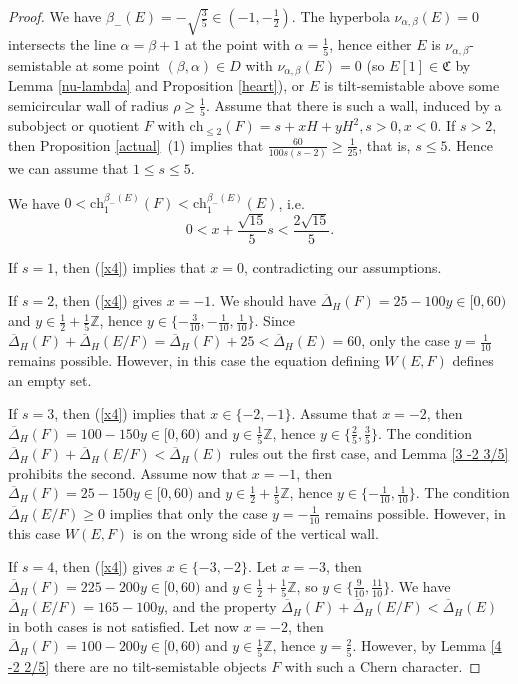 \documentclass[10pt,a4paper]{amsart}
\begin{document}
	\begin{proof} We have $\beta_-(E)=-\sqrt{\frac 35}\in(-1,-\frac 12)$. The hyperbola $\nu_{\alpha,\beta}(E)=0$ intersects the line $\alpha=\beta+1$ at the point with $\alpha=\frac 15$, hence either $E$ is $\nu_{\alpha,\beta}$-semistable at some point $(\beta,\alpha)\in D$ with $\nu_{\alpha,\beta}(E)=0$ (so $E[1]\in\mathfrak C$ by Lemma \ref{nu-lambda} and Proposition \ref{heart}), or $E$ is tilt-semistable above some semicircular wall of radius $\rho\ge\frac 15$. Assume that there is such a wall, induced by a subobject or quotient $F$ with $\mathrm{ch}_{\le 2}(F)=s+xH+yH^2,s>0,x<0$. If $s>2$, then Proposition \ref{actual}~(1) implies that $\frac{60}{100s(s-2)}\ge\frac{1}{25}$, that is, $s\le 5$. Hence we can assume that $1\le s\le 5$.
		
		We have $0<\mathrm{ch}_1^{\beta_-(E)}(F)<\mathrm{ch}_1^{\beta_-(E)}(E)$, i.e.
		\begin{equation}\label{x4}0<x+\frac{\sqrt{15}}{5}s<\frac{2\sqrt{15}}{5}.
		\end{equation}
		
		If $s=1$, then (\ref{x4}) implies that $x=0$, contradicting our assumptions.
		
		If $s=2$, then (\ref{x4}) gives $x=-1$. We should have $\overline{\Delta}_H(F)=25-100y\in[0,60)$ and $y\in\frac 12+\frac 15\mathbb Z$, hence $y\in\{-\frac{3}{10},-\frac{1}{10},\frac{1}{10}\}$. Since $\overline{\Delta}_H(F)+\overline{\Delta}_H(E/F)=\overline{\Delta}_H(F)+25<\overline{\Delta}_H(E)=60$, only the case $y=\frac{1}{10}$ remains possible. However, in this case the equation defining $W(E,F)$ defines an empty set.
		
		If $s=3$, then (\ref{x4}) implies that $x\in\{-2,-1\}$. Assume that $x=-2$, then $\overline{\Delta}_H(F)=100-150y\in[0,60)$ and $y\in\frac 15\mathbb Z$, hence $y\in\{\frac 25,\frac 35\}$. The condition $\overline{\Delta}_H(F)+\overline{\Delta}_H(E/F)<\overline{\Delta}_H(E)$ rules out the first case, and Lemma \ref{3 -2 3/5} prohibits the second. Assume now that $x=-1$, then $\overline{\Delta}_H(F)=25-150y\in[0,60)$ and $y\in\frac 12+\frac 15\mathbb Z$, hence $y\in\{-\frac{1}{10},\frac{1}{10}\}$. The condition $\overline{\Delta}_H(E/F)\ge 0$ implies that only the case $y=-\frac{1}{10}$ remains possible. However, in this case $W(E,F)$ is on the wrong side of the vertical wall.
		
		If $s=4$, then (\ref{x4}) gives $x\in\{-3,-2\}$. Let $x=-3$, then $\overline{\Delta}_H(F)=225-200y\in[0,60)$ and $y\in\frac 12+\frac 15\mathbb Z$, so $y\in\{\frac{9}{10},\frac{11}{10}\}$. We have $\overline{\Delta}_H(E/F)=165-100y$, and the property $\overline{\Delta}_H(F)+\overline{\Delta}_H(E/F)<\overline{\Delta}_H(E)$ in both cases is not satisfied. Let now $x=-2$, then $\overline{\Delta}_H(F)=100-200y\in[0,60)$ and $y\in\frac 15\mathbb Z$, hence $y=\frac 25$. However, by Lemma \ref{4 -2 2/5} there are no tilt-semistable objects $F$ with such a Chern character.
		

\end{proof}
\end{document}
